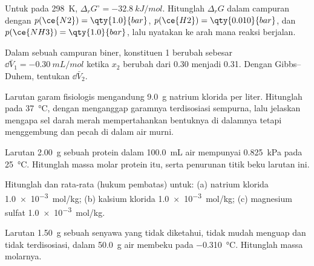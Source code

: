 \begin{exercise}[$\star$]\label{exo:b2:chemical-potential:4}
Untuk  pada \qty{298}{K},
$\Delta_r G^\circ =
\qty{-32.8}{kJ/mol}$. Hitunglah $\Delta_r G$ dalam
campuran dengan $p(\ce{N2}) = \qty{1.0}{bar}$, $p(\ce{H2}) = \qty{0.010}{bar}$, dan $p(\ce{NH3}) = \qty{1.0}{bar}$, lalu nyatakan ke
arah mana reaksi berjalan.
\end{exercise}

\begin{exercise}[$\star\star$]\label{exo:b2:chemical-potential:5}
Dalam sebuah campuran biner,  konstituen 1 berubah
sebesar $\dd\bar V_1 = \qty{-0.30}{mL/mol}$ ketika $x_2$ berubah dari 0.30
menjadi 0.31. Dengan Gibbs--Duhem, tentukan $\dd\bar V_2$.
\end{exercise}

\begin{exercise}[$\star\star$]\label{exo:b2:chemical-potential:6}
Larutan garam fisiologis mengandung \qty{9.0}{g} natrium klorida per liter.
Hitunglah  pada \qty{37}{\celsius}, dengan menganggap
garamnya terdisosiasi sempurna, lalu jelaskan mengapa sel darah merah
mempertahankan bentuknya di dalamnya tetapi menggembung dan pecah di
dalam air murni.
\end{exercise}

\begin{exercise}[$\star\star$]\label{exo:b2:chemical-potential:7}
Larutan \qty{2.00}{g} sebuah protein dalam \qty{100.0}{mL} air mempunyai
 \qty{0.825}{kPa} pada \qty{25}{\celsius}. Hitunglah massa
molar protein itu, serta penurunan titik beku larutan ini.
\end{exercise}

\begin{exercise}[$\star\star$]\label{exo:b2:chemical-potential:8}
Hitunglah  dan  rata-rata (hukum pembatas)
untuk: (a) natrium klorida \qty{1.0e-3}{mol/kg}; (b) kalsium klorida
\qty{1.0e-3}{mol/kg}; (c) magnesium sulfat \qty{1.0e-3}{mol/kg}.
\end{exercise}

\begin{exercise}[$\star\star$]\label{exo:b2:chemical-potential:9}
Larutan \qty{1.50}{g} sebuah senyawa yang tidak diketahui, tidak mudah
menguap dan tidak terdisosiasi, dalam \qty{50.0}{g} air membeku pada
\qty{-0.310}{\celsius}. Hitunglah massa molarnya.
\end{exercise}

